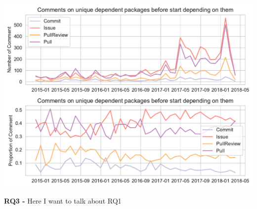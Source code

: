 \includegraphics[width=\columnwidth]{Photos/RQ2.pdf} 


\textbf{RQ3 - } Here I want to talk about RQ1


